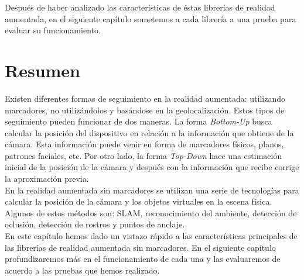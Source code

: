 Después de haber analizado las características de éstas librerías de realidad aumentada, en el siguiente capítulo sometemos a cada librería a una prueba para evaluar su funcionamiento.

\section*{Resumen}
Existen diferentes formas de seguimiento en la realidad aumentada: utilizando marcadores, no utilizándolos y basándose en la geolocalización. Estos tipos de seguimiento pueden funcionar de dos maneras. La forma \textit{Bottom-Up} busca calcular la posición del dispositivo en relación a la información que obtiene de la cámara. Esta información puede venir en forma de marcadores físicos, planos, patrones faciales, etc. Por otro lado, la forma \textit{Top-Down} hace una estimación inicial de la posición de la cámara y después con la información que recibe corrige la aproximación previa.\\

En la realidad aumentada sin marcadores se utilizan una serie de tecnologías para calcular la posición de la cámara y los objetos virtuales en la escena física. Algunos de estos métodos son: SLAM, reconocimiento del ambiente, detección de oclusión, detección de rostros y puntos de anclaje.\\

En este capítulo hemos dado un vistazo rápido a las características principales de las librerías de realidad aumentada sin marcadores. En el siguiente capítulo profundizaremos más en el funcionamiento de cada una y las evaluaremos de acuerdo a las pruebas que hemos realizado.

\noindent